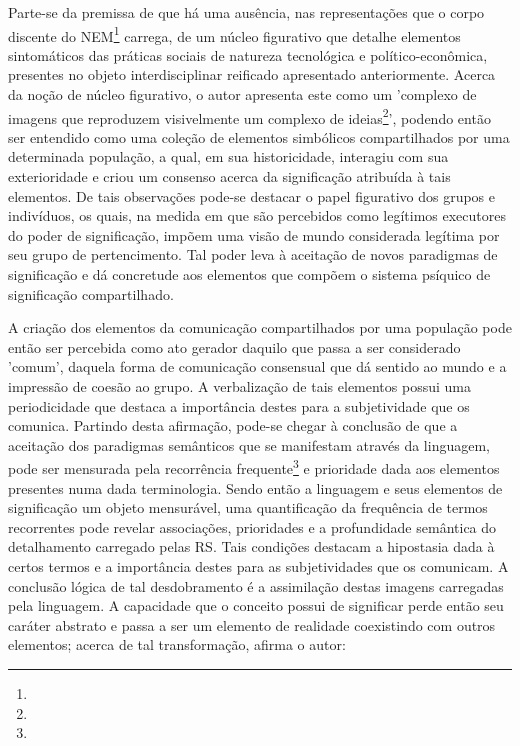 \documentclass[
  12pt,       %
  openright,      %
  twoside,      %
  a4paper,      %
  english,      %
  french,       %
  spanish,      %
  brazil        %
  ]{abntex2}
\begin{document}
Parte-se da premissa de que há uma ausência, nas representações que o corpo discente do NEM\footnote{} carrega, de um núcleo figurativo que detalhe elementos sintomáticos das práticas sociais de natureza tecnológica e político-econômica, presentes no objeto interdisciplinar reificado apresentado anteriormente. Acerca da noção de núcleo figurativo, o autor apresenta este como um 'complexo de imagens que reproduzem visivelmente um complexo de ideias\footnote{}', podendo então ser entendido como uma coleção de elementos simbólicos compartilhados por uma determinada população, a qual, em sua historicidade, interagiu com sua exterioridade e criou um consenso acerca da significação atribuída à tais elementos. De tais observações pode-se destacar o papel figurativo dos grupos e indivíduos, os quais, na medida em que são percebidos como legítimos executores do poder de significação, impõem uma visão de mundo considerada legítima por seu grupo de pertencimento. Tal poder leva à aceitação de novos paradigmas de significação e dá concretude aos elementos que compõem o sistema psíquico de significação compartilhado.

A criação dos elementos da comunicação compartilhados por uma população pode então ser percebida como ato gerador daquilo que passa a ser considerado 'comum', daquela forma de comunicação consensual  que dá sentido ao mundo e a impressão de coesão ao grupo. A verbalização de tais elementos possui uma periodicidade que destaca a importância destes para a subjetividade que os comunica. Partindo desta afirmação, pode-se chegar à conclusão de que a aceitação dos paradigmas semânticos que se manifestam através da linguagem, pode ser mensurada pela recorrência frequente\footnote{} e prioridade dada aos elementos presentes numa dada terminologia. Sendo então a linguagem e seus elementos de significação um objeto mensurável, uma quantificação da frequência de termos recorrentes pode revelar associações, prioridades e a profundidade semântica do detalhamento carregado pelas RS. Tais condições destacam a hipostasia dada à certos termos e a importância destes para as subjetividades que os comunicam. A conclusão lógica de tal desdobramento é a assimilação destas imagens carregadas pela linguagem. A capacidade que o conceito possui de significar perde então seu caráter abstrato e passa a ser um elemento de realidade coexistindo com outros elementos; acerca de tal transformação, afirma o autor:
\end{document}
